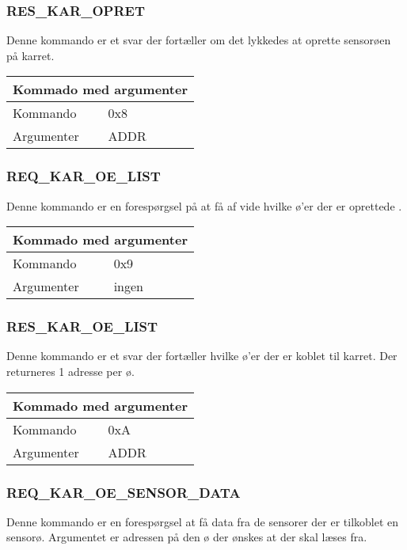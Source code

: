 \subsubsection{RES\_KAR\_OPRET}
Denne kommando er et svar der fortæller om det lykkedes at oprette sensorøen på karret.

\begin{table}[H]
\setlength{\parindent}{12pt}
\begin{tabular}{|l|lcc|}
\hline
\multicolumn{4}{|c|}{Kommado med argumenter}\\\hline
Kommando & 0x8 & & \\
Argumenter & ADDR & & \\\hline
\end{tabular}
\end{table}


\subsubsection{REQ\_KAR\_OE\_LIST}
Denne kommando er en forespørgsel på at få af vide hvilke ø'er der er oprettede .

\begin{table}[H]
\setlength{\parindent}{12pt}
\begin{tabular}{|l|lcc|}
\hline
\multicolumn{4}{|c|}{Kommado med argumenter}\\\hline
Kommando & 0x9 & & \\
Argumenter & ingen & & \\\hline
\end{tabular}
\end{table}


\subsubsection{RES\_KAR\_OE\_LIST}
Denne kommando er et svar der fortæller hvilke ø'er der er koblet til karret. Der returneres 1 adresse per ø.

\begin{table}[H]
\setlength{\parindent}{12pt}
\begin{tabular}{|l|lcc|}
\hline
\multicolumn{4}{|c|}{Kommado med argumenter}\\\hline
Kommando & 0xA & & \\
Argumenter & ADDR & & \\\hline
\end{tabular}
\end{table}

\subsubsection{REQ\_KAR\_OE\_SENSOR\_DATA}
Denne kommando er en forespørgsel at få data fra de sensorer der er tilkoblet en sensorø. Argumentet er adressen på den ø der ønskes at der skal læses fra.

